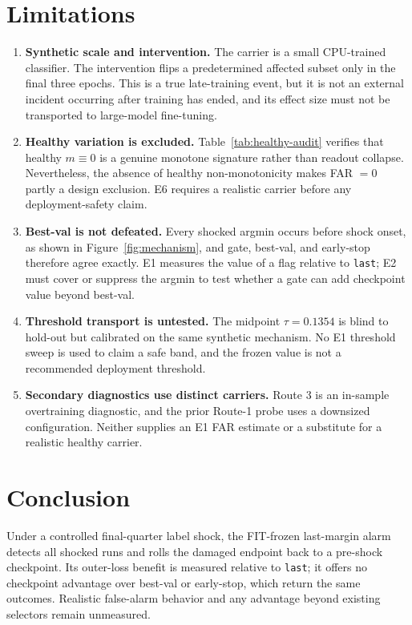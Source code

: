 \documentclass{article} %
\theoremstyle{remark}
\begin{document}
\section{Limitations}
\label{sec:limits}

\begin{enumerate}
\item \textbf{Synthetic scale and intervention.} The carrier is a small CPU-trained classifier.
The intervention flips a predetermined affected subset only in the final three epochs. This is a
true late-training event, but it is not an external incident occurring after training has ended,
and its effect size must not be transported to large-model fine-tuning.
\item \textbf{Healthy variation is excluded.} Table~\ref{tab:healthy-audit} verifies that healthy
$m\equiv0$ is a genuine monotone signature rather than readout collapse. Nevertheless, the absence
of healthy non-monotonicity makes FAR $=0$ partly a design exclusion. E6 requires a realistic
carrier before any deployment-safety claim.
\item \textbf{Best-val is not defeated.} Every shocked argmin occurs before shock onset, as shown
in Figure~\ref{fig:mechanism}, and gate, best-val, and early-stop therefore agree exactly. E1
measures the value of a flag relative to \texttt{last}; E2 must cover or suppress the argmin to test
whether a gate can add checkpoint value beyond best-val.
\item \textbf{Threshold transport is untested.} The midpoint $\tau=0.1354$ is blind to hold-out but
calibrated on the same synthetic mechanism. No E1 threshold sweep is used to claim a safe band, and
the frozen value is not a recommended deployment threshold.
\item \textbf{Secondary diagnostics use distinct carriers.} Route 3 is an in-sample overtraining
diagnostic, and the prior Route-1 probe uses a downsized configuration. Neither supplies an E1 FAR
estimate or a substitute for a realistic healthy carrier.
\end{enumerate}

\section{Conclusion}
\label{sec:conclusion}

Under a controlled final-quarter label shock, the FIT-frozen last-margin alarm detects all shocked
runs and rolls the damaged endpoint back to a pre-shock checkpoint. Its outer-loss benefit is
measured relative to \texttt{last}; it offers no checkpoint advantage over best-val or early-stop,
which return the same outcomes. Realistic false-alarm behavior and any advantage beyond existing
selectors remain unmeasured.
\end{document}
